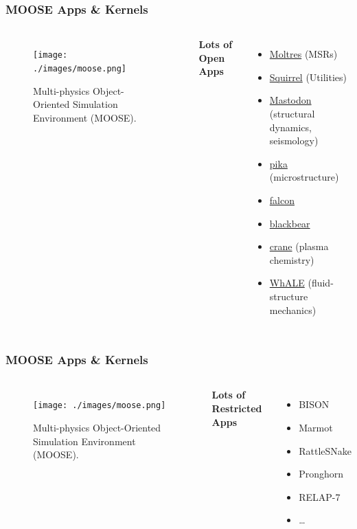 \begin{frame}
        \frametitle{MOOSE Apps \& Kernels}
  \begin{columns}
    \column[t]{6cm}
  \begin{figure}[t]
     \vspace{-0.25in}
       \hspace*{-0.25in}
       \texttt{[image: ./images/moose.png]}
            \caption{Multi-physics Object-Oriented Simulation Environment (MOOSE).}
  \end{figure}
        \column[t]{4cm}
          \textbf{Lots of Open Apps}
           \begin{itemize} 
                   \item \href{https://github.com/arfc/moltres}{Moltres} (MSRs) \cite{lindsay_introduction_2019}
                   \item \href{https://github.com/arfc/squirrel}{Squirrel} (Utilities)
                   \item \href{https://github.com/idaholab/mastodon}{Mastodon} (structural dynamics, seismology)
                   \item \href{https://github.com/idaholab/pika}{pika} (microstructure)
                   \item \href{https://github.com/idaholab/falcon}{falcon}
                   \item \href{https://github.com/idaholab/blackbear}{blackbear}
                   \item \href{https://github.com/lcpp-org/crane}{crane} (plasma chemistry)
                   \item \href{https://github.com/casperversteeg/WhALE}{WhALE} (fluid-structure mechanics)
          \end{itemize}
  \end{columns}
\end{frame}

\begin{frame}
        \frametitle{MOOSE Apps \& Kernels}
  \begin{columns}
    \column[t]{6cm}
  \begin{figure}[t]
     \vspace{-0.25in}
       \hspace*{-0.25in}
       \texttt{[image: ./images/moose.png]}
            \caption{Multi-physics Object-Oriented Simulation Environment (MOOSE).}
  \end{figure}
        \column[t]{4cm}
          \textbf{Lots of Restricted Apps}\\
           \begin{itemize} 
                   \item BISON
                   \item Marmot
                   \item RattleSNake
                   \item Pronghorn
                   \item RELAP-7
                   \item \ldots 
          \end{itemize}
  \end{columns}
\end{frame}


